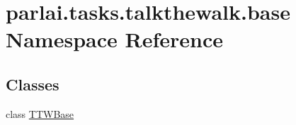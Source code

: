 \hypertarget{namespaceparlai_1_1tasks_1_1talkthewalk_1_1base}{}\section{parlai.\+tasks.\+talkthewalk.\+base Namespace Reference}
\label{namespaceparlai_1_1tasks_1_1talkthewalk_1_1base}
\subsection*{Classes}
\begin{DoxyCompactItemize}
\item 
class \hyperlink{classparlai_1_1tasks_1_1talkthewalk_1_1base_1_1TTWBase}{T\+T\+W\+Base}
\end{DoxyCompactItemize}
